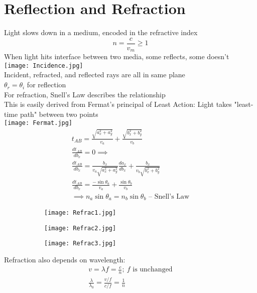 \documentclass[a4paper, 11pt, fleqn, normalem]{report}
\begin{document}
\section{Reflection and Refraction}
Light slows down in a medium, encoded in the refractive index
\begin{equation*}
    n = \frac{c}{v_{m}} \geq 1
\end{equation*}
When light hits interface between two media, some reflects, some doesn't \\
\texttt{[image: Incidence.jpg]} \\
Incident, refracted, and reflected rays are all in same plane \\
$\theta_{r} = \theta_{i}$ for reflection \\
For refraction, Snell's Law describes the relationship \\
This is easily derived from Fermat's principal of Least Action: Light takes "least-time path" between two points\\
\texttt{[image: Fermat.jpg]}
\begin{gather*}
    t_{AB} = \frac{\sqrt{a_{x}^{2} + a_{y}^{2}}}{v_{a}} + \frac{\sqrt{b_{x}^{2} + b_{y}^{2}}}{v_{b}} \\
    \frac{dt_{AB}}{db_{x}} = 0 \implies \\
    \frac{dt_{AB}}{db_{x}} = \frac{b_{x}}{v_{a}\sqrt{a_{x}^{2} + a_{y}^{2}}}\frac{da_{x}}{db_{x}} + \frac{b_{x}}{v_{b}\sqrt{b_{x}^{2} + b_{y}^{2}}} \\
    \frac{dt_{AB}}{db_{x}} = \frac{-\sin{\theta_{a}}}{v_{a}} + \frac{\sin{\theta_{b}}}{v_{b}} \\
    \implies n_{a}\sin{\theta_{a}} = n_{b}\sin{\theta_{b}}\text{ -- Snell's Law}
\end{gather*}
\begin{figure}[H]
    \begin{subfigure}{0.3\textwidth}
        \texttt{[image: Refrac1.jpg]}
    \end{subfigure}
    \begin{subfigure}{0.3\textwidth}
        \texttt{[image: Refrac2.jpg]}
    \end{subfigure}
    \begin{subfigure}{0.3\textwidth}
        \texttt{[image: Refrac3.jpg]}
    \end{subfigure}
\end{figure}
Refraction also depends on wavelength:
\begin{gather*}
    v = \lambda f = \frac{c}{n};~f\text{ is unchanged} \\
    \frac{\lambda}{\lambda_{0}} = \frac{v/f}{c/f} = \frac{1}{n}
\end{gather*}
\end{document}
